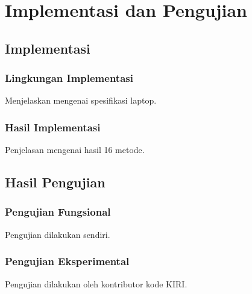 \chapter{Implementasi dan Pengujian}
\label{chap:implementasipengujian}

\section{Implementasi}
\label{sec:implementasi}

\subsection{Lingkungan Implementasi}
\label{sec:lingkunganimplementasi}
Menjelaskan mengenai spesifikasi laptop.

\subsection{Hasil Implementasi}
\label{sec:hasilimplementasi}
Penjelasan mengenai hasil 16 metode.

\section{Hasil Pengujian}
\label{sec:hasilpengujian}

\subsection{Pengujian Fungsional}
\label{sec:pengujianfungsional}
Pengujian dilakukan sendiri.

\subsection{Pengujian Eksperimental}
\label{sec:pengujianeksperimental}
Pengujian dilakukan oleh kontributor kode KIRI.